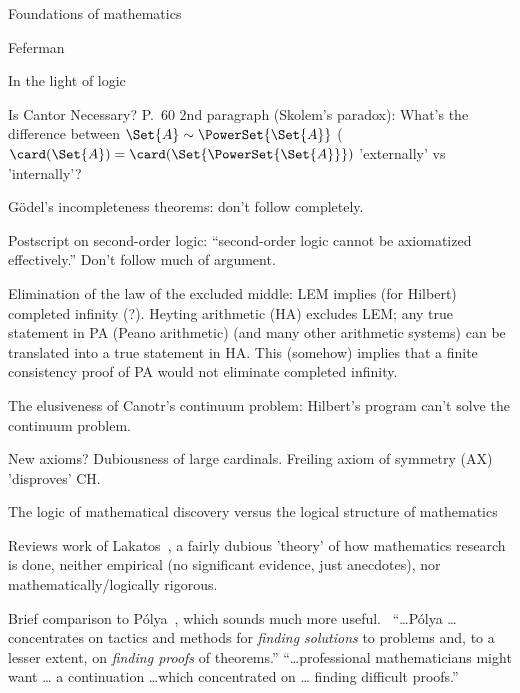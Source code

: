 \begin{plSection}{Foundations of mathematics}
\begin{plSection}{Feferman}
\begin{plSection}{In the light of logic}
\begin{plSection}{Is Cantor Necessary?}
P.~$60$ $2$nd paragraph (Skolem's paradox):
\hfill\break
What's the difference between $\Set{A} \sim \PowerSet{\Set{A}}$ 
($\card(\Set{A})=\card(\Set{\PowerSet{\Set{A}}})$
 'externally' vs 'internally'?

\textsf{G\"{o}del's incompleteness theorems:}
don't follow completely.

\textsf{Postscript on second-order logic:}
``second-order logic cannot be axiomatized effectively.''
Don't follow much of argument.

\textsf{Elimination of the law of the excluded middle:}
\hfill\break
LEM implies (for Hilbert) completed infinity (?).
\hfill\break
Heyting arithmetic (HA) excludes LEM;
any true statement in PA (Peano arithmetic) 
(and many other arithmetic systems)
can be translated into
a true statement in HA.
\hfill\break
This (somehow) implies that a finite consistency proof
of PA would not eliminate completed infinity.

\textsf{The elusiveness of Canotr's continuum problem:}
\hfill\break
Hilbert's program can't solve the continuum problem.


\textsf{New axioms?}
\hfill\break
Dubiousness of large cardinals.
\hfill\break
Freiling axiom of 
symmetry (AX)~\cite{Freiling:1986:Symmetry,wiki:FreilingsAxiomOfSymmetry}
'disproves' CH.

\end{plSection}%
\begin{plSection}{The logic of mathematical discovery 
versus the logical structure of mathematics}
\label{sec:logic_of_mathematical_discovery}

\cite[ch.~3 ``The logic of mathematical discovery versus
the logical structure of mathematics'']{Feferman:1998:LightOfLogic}

Reviews work of Lakatos~\cite{Lakatos:1976:Proofs,Lakatos:1978:MSE},
a fairly dubious 'theory' of how mathematics research is done,
neither empirical (no significant evidence, just anecdotes),
nor mathematically/logically rigorous.

Brief comparison to 
P\'{o}lya~\cite[ch~3,sec~7]{Feferman:1998:LightOfLogic},
which sounds much more useful.~\cite{Polya:1957:SolveIt,
Polya:1965:MathDiscovery,Polya:1968:PlausibleReasoning}
``\ldots P\'{o}lya \ldots concentrates on tactics and methods
for \textit{finding solutions} to problems and, 
to a lesser extent,
on \textit{finding proofs} of theorems.''
\hfill\break
``\ldots professional mathematicians might want \ldots
a continuation \ldots which concentrated on \ldots
finding difficult proofs.''


\end{plSection}
\end{plSection}
\end{plSection}
\end{plSection}
